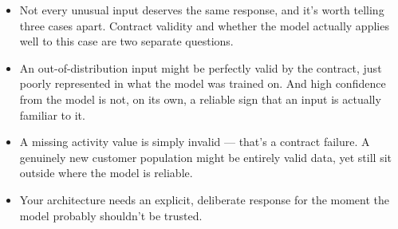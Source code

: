 \documentclass[11pt,a4paper]{article}
\begin{document}
\begin{examplebox}[title after break={SPOKEN SCRIPT --- slide 47 continued}]
\begin{itemize}
\item Not every unusual input deserves the same response, and it's worth telling three cases apart. Contract validity and whether the model actually applies well to this case are two separate questions.
\item An out-of-distribution input might be perfectly valid by the contract, just poorly represented in what the model was trained on. And high confidence from the model is not, on its own, a reliable sign that an input is actually familiar to it.
\item A missing activity value is simply invalid — that's a contract failure. A genuinely new customer population might be entirely valid data, yet still sit outside where the model is reliable.
\item Your architecture needs an explicit, deliberate response for the moment the model probably shouldn't be trusted.
\end{itemize}
\end{examplebox}
\par\noindent{\scriptsize\textcolor{teal!60!black}{Reading anchor: Bucaioni, published Table 1, pp. 6–7 · Bass, Ch. 14}}
\clearpage
\end{document}
